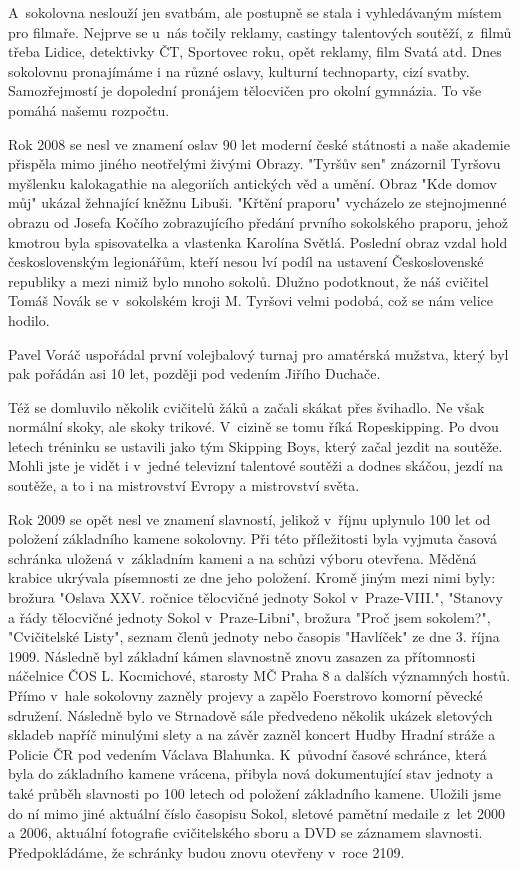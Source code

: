 \documentclass[a5paper, 11pt, twoside]{article}
\begin{document}
A~sokolovna neslouží jen svatbám, ale postupně se stala i vyhledávaným
místem pro filmaře. Nejprve se u~nás točily reklamy, castingy
talentových soutěží, z~filmů třeba Lidice, detektivky ČT, Sportovec
roku, opět reklamy, film Svatá atd. Dnes sokolovnu pronajímáme i na
různé oslavy, kulturní technoparty, cizí svatby. Samozřejmostí je
dopolední pronájem tělocvičen pro okolní gymnázia. To vše pomáhá našemu
rozpočtu.

Rok 2008 se nesl ve znamení oslav 90 let moderní české státnosti a naše
akademie přispěla mimo jiného neotřelými živými Obrazy. "Tyršův sen"
znázornil Tyršovu myšlenku kalokagathie na alegoriích antických věd a
umění. Obraz "Kde domov můj" ukázal žehnající kněžnu Libuši. "Křtění
praporu" vycházelo ze stejnojmenné obrazu od Josefa Kočího
zobrazujícího předání prvního sokolského praporu, jehož kmotrou byla
spisovatelka a vlastenka Karolína Světlá. Poslední obraz vzdal hold
československým legionářům, kteří nesou lví podíl na ustavení
Československé republiky a mezi nimiž bylo mnoho sokolů. Dlužno
podotknout, že náš cvičitel Tomáš Novák se v~sokolském kroji M. Tyršovi
velmi podobá, což se nám velice hodilo.

Pavel Voráč uspořádal první volejbalový turnaj pro amatérská mužstva,
který byl pak pořádán asi 10 let, později pod vedením Jiřího Duchače.

Též se domluvilo několik cvičitelů žáků a začali skákat přes švihadlo.
Ne však normální skoky, ale skoky trikové. V~cizině se tomu říká
Ropeskipping. Po dvou letech tréninku se ustavili jako tým Skipping
Boys, který začal jezdit na soutěže. Mohli jste je vidět i v~jedné
televizní talentové soutěži a dodnes skáčou, jezdí na soutěže, a to i na
mistrovství Evropy a mistrovství světa.

Rok 2009 se opět nesl ve znamení slavností, jelikož v~říjnu uplynulo 100
let od položení základního kamene sokolovny. Při této příležitosti byla
vyjmuta časová schránka uložená v~základním kameni a na schůzi výboru
otevřena. Měděná krabice ukrývala písemnosti ze dne jeho položení. Kromě
jiným mezi nimi byly: brožura "Oslava XXV. ročnice tělocvičné jednoty
Sokol v~Praze-VIII.", "Stanovy a řády tělocvičné jednoty Sokol
v~Praze-Libni", brožura "Proč jsem sokolem?", "Cvičitelské Listy",
seznam členů jednoty nebo časopis "Havlíček" ze dne 3. října 1909.
Následně byl základní kámen slavnostně znovu zasazen za přítomnosti
náčelnice ČOS L. Kocmichové, starosty MČ Praha 8 a dalších významných
hostů. Přímo v~hale sokolovny zazněly projevy a zapělo Foerstrovo
komorní pěvecké sdružení. Následně bylo ve Strnadově sále předvedeno
několik ukázek sletových skladeb napříč minulými slety a na závěr zazněl
koncert Hudby Hradní stráže a Policie ČR pod vedením Václava Blahunka.
K~původní časové schránce, která byla do základního kamene vrácena,
přibyla nová dokumentující stav jednoty a také průběh slavnosti po 100
letech od položení základního kamene. Uložili jsme do ní mimo jiné
aktuální číslo časopisu Sokol, sletové pamětní medaile z~let 2000 a
2006, aktuální fotografie cvičitelského sboru a DVD se záznamem
slavnosti. Předpokládáme, že schránky budou znovu otevřeny v~roce 2109.
\end{document}
